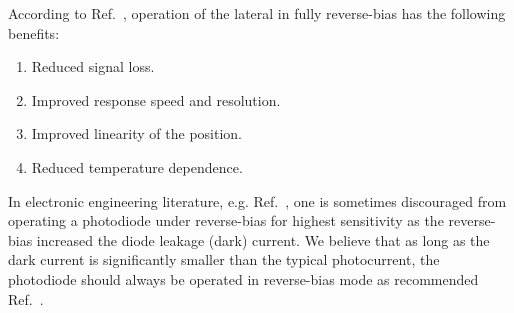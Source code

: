 According to Ref.~\cite{Woltring75}, operation of the lateral in fully reverse-bias has the following benefits:
\begin{enumerate}
	\item Reduced signal loss.
	\item Improved response speed and resolution.
	\item Improved linearity of the position.
	\item Reduced temperature dependence.
\end{enumerate}
In electronic engineering literature, e.g. Ref.~\cite[p.~258]{Jung05}, one is sometimes discouraged from operating a photodiode under reverse-bias for highest sensitivity as the reverse-bias increased the diode leakage (dark) current.
We believe that as long as the dark current is significantly smaller than the typical photocurrent, the photodiode should always be operated in reverse-bias mode as recommended Ref.~\cite{Noorlag74,Woltring75,Wang89,Hobbs11}.

